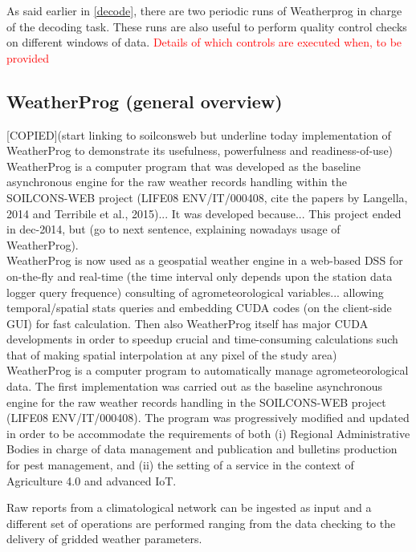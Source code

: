 \documentclass[authoryear,preprint,review,12pt]{elsarticle}
\begin{document}
As said earlier in \cref{decode}, there are two periodic runs of Weatherprog in charge of the decoding task. These runs are also useful to perform quality control checks on different windows of data. \textcolor{red}{Details of which controls are executed when, to be provided}

\subsection{WeatherProg (general overview)}
[COPIED](start linking to soilconsweb but underline today implementation of WeatherProg to demonstrate its usefulness, powerfulness and readiness-of-use)\\
WeatherProg is a computer program that was developed as the baseline asynchronous engine for the raw weather records handling within the SOILCONS-WEB project (LIFE08 ENV/IT/000408, cite the papers by Langella, 2014 and Terribile et al., 2015)... 
It was developed because... 
This project ended in dec-2014, but (go to next sentence, explaining nowadays usage of WeatherProg).\\
WeatherProg is now used as a geospatial weather engine in a web-based DSS for on-the-fly and real-time (the time interval only depends upon the station data logger query frequence) consulting of agrometeorological variables... allowing temporal/spatial stats queries and embedding CUDA codes (on the client-side GUI) for fast calculation. Then also WeatherProg itself has major CUDA developments in order to speedup crucial and time-consuming calculations such that of making spatial interpolation at any pixel of the study area)\\


WeatherProg \citep{langella:weatherprog2014} is a computer program to automatically manage agrometeorological data.
The first implementation was carried out as the baseline asynchronous engine for the raw weather records handling in the SOILCONS-WEB project (LIFE08 ENV/IT/000408).
The program was progressively modified and updated in order to be accommodate the requirements of both (i) Regional Administrative Bodies in charge of data management and publication and bulletins production for pest management, and (ii) the setting of a service in the context of Agriculture 4.0 and advanced IoT.

Raw reports from a climatological network can be ingested as input and a different set of operations are performed ranging from the data checking to the delivery of gridded weather parameters.
\end{document}
